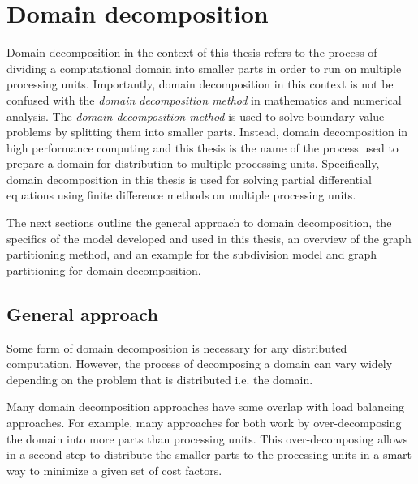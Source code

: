 \section{Domain decomposition}
% 
% 
Domain decomposition in the context of this thesis refers to the process of dividing a computational domain into smaller parts in order to run on multiple processing units.
Importantly, domain decomposition in this context is not be confused with the \textit{domain decomposition method} in mathematics and numerical analysis.
The \textit{domain decomposition method} is used to solve boundary value problems by splitting them into smaller parts.
Instead, domain decomposition in high performance computing and this thesis is the name of the process used to prepare a domain for distribution to multiple processing units.
Specifically, domain decomposition in this thesis is used for solving partial differential equations using finite difference methods on multiple processing units.

The next sections outline the general approach to domain decomposition, the specifics of the model developed and used in this thesis, an overview of the graph partitioning method, and an example for the subdivision model and graph partitioning for domain decomposition.

\subsection{General approach}
Some form of domain decomposition is necessary for any distributed computation.
However, the process of decomposing a domain can vary widely depending on the problem that is distributed i.e. the domain.

Many domain decomposition approaches have some overlap with load balancing approaches. 
For example, many approaches for both work by over-decomposing the domain into more parts than processing units.
This over-decomposing allows in a second step to distribute the smaller parts to the processing units in a smart way to minimize a given set of cost factors.

